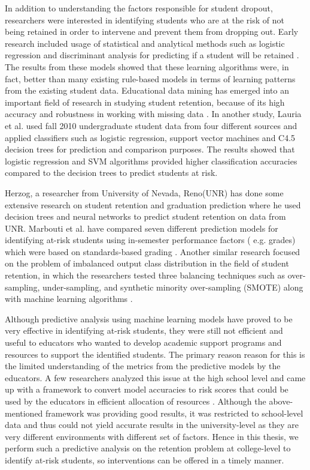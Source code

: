 \documentclass[11pt,openright]{report}
\begin{document}
In addition to understanding the factors responsible for student dropout, researchers were interested in identifying students who are at the risk of not being retained in order to intervene and prevent them from dropping out. Early research included usage of statistical and analytical methods such as logistic regression and discriminant analysis for predicting if a student will be retained \cite{lakkaraju2015machine,marbouti2016models,adejo2017}. The results from these models showed that these learning algorithms were, in fact, better than many existing rule-based models in terms of learning patterns from the existing student data. Educational data mining has emerged into an important field of research in studying student retention, because of its high accuracy and robustness in working with missing data \cite{alkhasawneh2014developing}. In another study, Lauria et al. used fall 2010 undergraduate student data from four different sources and applied classifiers such as logistic regression, support vector machines and C4.5 decision trees for prediction and comparison purposes\cite{lauria2012mining}. The results showed that logistic regression and SVM algorithms provided higher classification accuracies compared to the decision trees to predict students at risk. 

Herzog, a researcher from University of Nevada, Reno(UNR) has done some extensive research on student retention and graduation prediction where he used decision trees and neural networks to predict student retention on data from UNR\cite{herzog2006estimating}. Marbouti et al. have compared seven different prediction models for identifying at-risk students using in-semester performance factors ( e.g. grades) which were based on standards-based grading \cite{marbouti2016models} . Another similar research focused on the problem of imbalanced output class distribution in the field of student retention, in which the researchers tested three balancing techniques such as over-sampling, under-sampling, and synthetic minority over-sampling (SMOTE) along with machine learning algorithms \cite{thammasiri2014critical}.

Although predictive analysis using machine learning models have proved to be very effective in identifying at-risk students, they were still not efficient and useful to educators who wanted to develop academic support programs and resources to support the identified students. The primary reason reason for this is the limited understanding of the metrics from the predictive models by the educators. A few researchers analyzed this issue at the high school level and came up with a framework to convert model accuracies to risk scores that could be used by the educators in efficient allocation of resources \cite{lakkaraju2015machine}. Although the above-mentioned framework was providing good results, it was restricted to school-level data and thus could not yield accurate results in the university-level as they are very different environments with different set of factors. Hence in this thesis, we perform such a predictive analysis on the retention problem at college-level  to identify at-risk students, so interventions can be offered in a timely manner.
\end{document}
